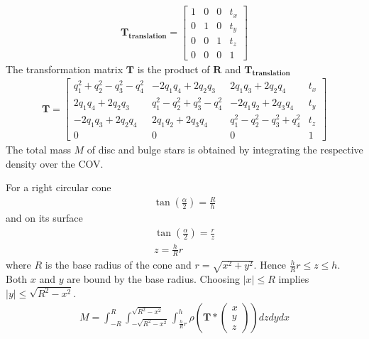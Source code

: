 \documentclass[letterpaper,10pt,english]{sphinxmanual}
\begin{document}
\begin{equation*}
\begin{split}\mathbf{T_{translation}}=\begin{bmatrix}
1 & 0 & 0 & t_{x}\\
0 & 1 & 0 & t_{y}\\
0 & 0 & 1 & t_{z}\\
0  & 0 & 0 & 1
\end{bmatrix}\end{split}
\end{equation*}
\sphinxAtStartPar
The transformation matrix \(\mathbf{T}\) is the product of \(\mathbf{R}\) and \(\mathbf{T_{translation}}\)
\begin{equation}\label{equation:NBodySimulation/Initialization:transformation_matrix}
\begin{split}\mathbf{T}=\begin{bmatrix}
 q_{1}^{2}+q_{2}^{2}-q_{3}^{2}-q_{4}^{2} & -2q_{1}q_{4}+2q_{2}q_{3} & 2q_{1}q_{3}+2q_{2}q_{4} & t_{x}\\
 2q_{1}q_{4}+2q_{2}q_{3} & q_{1}^{2}-q_{2}^{2}+q_{3}^{2}-q_{4}^{2} & -2q_{1}q_{2}+2q_{3}q_{4} & t_{y}\\
 -2q_{1}q_{3}+2q_{2}q_{4} & 2q_{1}q_{2}+2q_{3}q_{4} & q_{1}^{2}-q_{2}^{2}-q_{3}^{2}+q_{4}^{2} & t_{z}\\
 0  & 0 & 0 & 1
 \end{bmatrix}\end{split}
\end{equation}
\sphinxAtStartPar
The total mass \(M\) of disc and bulge stars is obtained by integrating the respective density over the COV.

\sphinxAtStartPar
For a right circular cone
\begin{equation*}
\begin{split}\tan\left (\frac{\alpha }{2}  \right ) = \frac{R}{h}\end{split}
\end{equation*}
\sphinxAtStartPar
and on its surface
\begin{equation*}
\begin{split}\tan\left (\frac{\alpha }{2}  \right ) = \frac{r}{z} \\
z = \frac{h}{R}r\end{split}
\end{equation*}
\sphinxAtStartPar
where \(R\) is the base radius of the cone and \(r = \sqrt{x^2+y^2}\). Hence \(\frac{h}{R}r\leq z\leq h\). Both \(x\) and \(y\) are bound by the base radius.
Choosing \(\left | x \right | \leq R\) implies \(\left | y \right | \leq \sqrt{R^2-x^2}\).
\begin{equation*}
\begin{split}M = \int_{-R}^{R}\int_{-\sqrt{R^2-x^2}}^{\sqrt{R^2-x^2}}\int_{\frac{h}{R}r}^{h} \rho \left ( \mathbf{T}*\begin{pmatrix}x\\ y\\ z\end{pmatrix} \right ) dzdydx\end{split}
\end{equation*}
\end{document}
